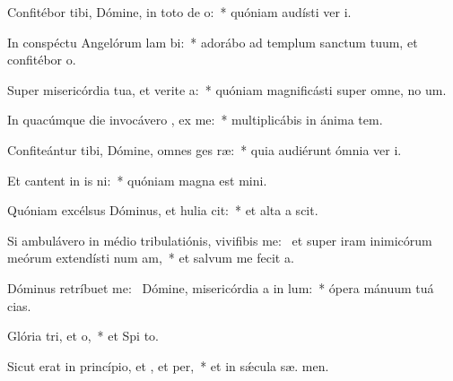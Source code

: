 \item Confitébor tibi, Dómine, in toto de o:~* quóniam audísti ver  i.
\item In conspéctu Angelórum lam bi:~* adorábo ad templum sanctum tuum, et confitébor  o.
\item Super misericórdia tua, et verite a:~* quóniam magnificásti super omne, no  um.
\item In quacúmque die invocávero , ex me:~* multiplicábis in ánima  tem.
\item Confiteántur tibi, Dómine, omnes ges ræ:~* quia audiérunt ómnia ver  i.
\item Et cantent in is ni:~* quóniam magna est  mini.
\item Quóniam excélsus Dóminus, et hulia cit:~* et alta a  scit.
\item Si ambulávero in médio tribulatiónis, vivifibis me:~\pscross{} et super iram inimicórum meórum extendísti num am,~* et salvum me fecit  a.
\item Dóminus retríbuet  me:~\pscross{} Dómine, misericórdia a in lum:~* ópera mánuum tuá  cias.
\item Glória tri, et o,~* et Spi to.
\item Sicut erat in princípio, et , et per,~* et in sǽcula sæ. men.
